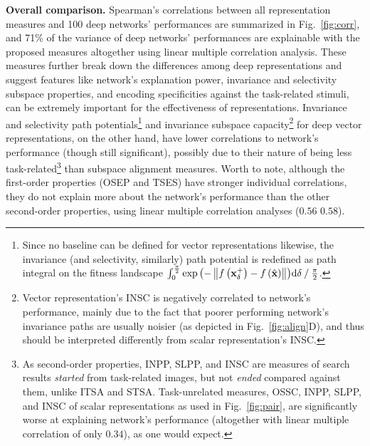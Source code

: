 \documentclass[10pt,twocolumn,letterpaper]{article}
\begin{document}

\newcommand{\defvecpp}{Since no baseline can be defined for vector representations likewise, the invariance (and selectivity, similarly) path potential is redefined as path integral on the fitness landscape $\int_{0}^{\frac{\pi}{2}}{\exp\left(-\left\|f\left(\bf{x}^{+}_{\delta}\right)-f\left(\hat{\bf{x}}\right)\right\|\right)}\mathrm{d}\delta \mathbin{/} {\frac{\pi}{2}}$.}

\newcommand{\expinsc}{Vector representation's INSC is negatively correlated to network's performance, mainly due to the fact that poorer performing network's invariance paths are usually noisier (as depicted in Fig.~\ref{fig:align}D), and thus should be interpreted differently from scalar representation's INSC.}

\newcommand{\expextrinsic}{As second-order properties, INPP, SLPP, and INSC are measures of search results \emph{started} from task-related images, but not \emph{ended} compared against them, unlike ITSA and STSA.
Task-unrelated measures, \ie OSSC, INPP, SLPP, and INSC of scalar representations as used in Fig.~\ref{fig:pair}, are significantly worse at explaining network's performance (altogether with linear multiple correlation of only $0.34$), as one would expect.
}

{\bf Overall comparison.} Spearman's correlations between all representation measures and 100 deep networks' performances are summarized in Fig.~\ref{fig:corr}, and 71\% of the variance of deep networks' performances are explainable with the proposed measures altogether using linear multiple correlation analysis.
These measures further break down the differences among deep representations and suggest features like network's explanation power, invariance and selectivity subspace properties, and encoding specificities against the task-related stimuli, can be extremely important for the effectiveness of representations.
Invariance and selectivity path potentials\footnote{\defvecpp} and invariance subspace capacity\footnote{\expinsc} for deep vector representations, on the other hand, have lower correlations to network's performance (though still significant), possibly due to their nature of being less task-related\footnote{\expextrinsic} than subspace alignment measures.
Worth to note, although the first-order properties (OSEP and TSES) have stronger individual correlations, they do not explain more about the network's performance than the other second-order properties, using linear multiple correlation analyses ($0.56$ \vs $0.58$).
\end{document}
